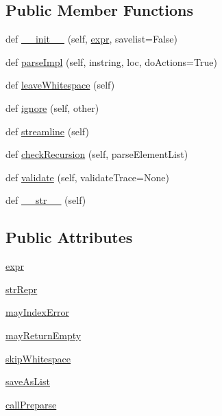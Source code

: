\subsection*{Public Member Functions}
\begin{DoxyCompactItemize}
\item 
def \hyperlink{classpyparsing_1_1ParseElementEnhance_a92a9f866489504fe97e4fcb4f5da7856}{\+\_\+\+\_\+init\+\_\+\+\_\+} (self, \hyperlink{classpyparsing_1_1ParseElementEnhance_a0139048279aeac38804a10d131d3c340}{expr}, savelist=False)
\item 
def \hyperlink{classpyparsing_1_1ParseElementEnhance_aeb2637c774f816662391da655de642bf}{parse\+Impl} (self, instring, loc, do\+Actions=True)
\item 
def \hyperlink{classpyparsing_1_1ParseElementEnhance_aea1547c03e1f457818d25d14673eae2b}{leave\+Whitespace} (self)
\item 
def \hyperlink{classpyparsing_1_1ParseElementEnhance_a905d181fa723dd7f828d423362ba040c}{ignore} (self, other)
\item 
def \hyperlink{classpyparsing_1_1ParseElementEnhance_a25b4479cc390cd234b939be8b8b921b9}{streamline} (self)
\item 
def \hyperlink{classpyparsing_1_1ParseElementEnhance_a976e2a922d1acbb806e501510a0f4ad3}{check\+Recursion} (self, parse\+Element\+List)
\item 
def \hyperlink{classpyparsing_1_1ParseElementEnhance_aa0493e06fa1f4545d2553b9c86f5e1a6}{validate} (self, validate\+Trace=None)
\item 
def \hyperlink{classpyparsing_1_1ParseElementEnhance_a98623e31fcb2ef21a5dc9216516a1506}{\+\_\+\+\_\+str\+\_\+\+\_\+} (self)
\end{DoxyCompactItemize}
\subsection*{Public Attributes}
\begin{DoxyCompactItemize}
\item 
\hyperlink{classpyparsing_1_1ParseElementEnhance_a0139048279aeac38804a10d131d3c340}{expr}
\item 
\hyperlink{classpyparsing_1_1ParseElementEnhance_a97d5897de62788da4a95a4528d0da16c}{str\+Repr}
\item 
\hyperlink{classpyparsing_1_1ParseElementEnhance_a0b180e927b98ebe3ca451abaefdb3c5c}{may\+Index\+Error}
\item 
\hyperlink{classpyparsing_1_1ParseElementEnhance_a1800dce29dda8a921916a11e22a2bc45}{may\+Return\+Empty}
\item 
\hyperlink{classpyparsing_1_1ParseElementEnhance_aa09037de037ff9499cc3e46f3f76bc54}{skip\+Whitespace}
\item 
\hyperlink{classpyparsing_1_1ParseElementEnhance_ad4ea66e0f600a07c27d16bf6fb5c6e2c}{save\+As\+List}
\item 
\hyperlink{classpyparsing_1_1ParseElementEnhance_ad73dc0e73493dcf85d236415674bc1e5}{call\+Preparse}
\end{DoxyCompactItemize}
